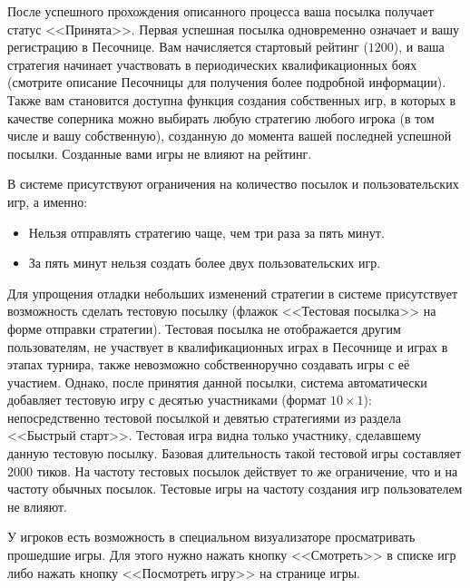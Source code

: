 После успешного прохождения описанного процесса ваша посылка получает статус <<Принята>>. Первая успешная посылка одновременно означает и
вашу регистрацию в Песочнице. Вам начисляется стартовый рейтинг ($1200$), и ваша стратегия начинает участвовать в периодических
квалификационных боях (смотрите описание Песочницы для получения более подробной информации). Также вам становится доступна функция создания
собственных игр, в которых в качестве соперника можно выбирать любую стратегию любого игрока (в том числе и вашу собственную), созданную до
момента вашей последней успешной посылки. Созданные вами игры не влияют на рейтинг.

В системе присутствуют ограничения на количество посылок и пользовательских игр, а именно:
\vspace{-0.15in}
\begin{itemize}
  \item Нельзя отправлять стратегию чаще, чем три раза за пять минут.
\vspace{-0.10in}
  \item За пять минут нельзя создать более двух пользовательских игр.
\vspace{-0.10in}
\end{itemize}

Для упрощения отладки небольших изменений стратегии в системе присутствует возможность сделать тестовую посылку (флажок <<Тестовая посылка>>
на форме отправки стратегии). Тестовая посылка не отображается другим пользователям, не участвует в квалификационных играх в Песочнице и
играх в этапах турнира, также невозможно собственноручно создавать игры с её участием. Однако, после принятия данной посылки, система
автоматически добавляет тестовую игру с десятью участниками (формат $10\times1$): непосредственно тестовой посылкой и девятью стратегиями из
раздела <<Быстрый старт>>. Тестовая игра видна только участнику, сделавшему данную тестовую посылку. Базовая длительность такой тестовой
игры составляет $2000$ тиков. На частоту тестовых посылок действует то же ограничение, что и на частоту обычных посылок. Тестовые игры на
частоту создания игр пользователем не влияют.

У игроков есть возможность в специальном визуализаторе просматривать прошедшие игры. Для этого нужно нажать кнопку <<Смотреть>> в списке игр
либо нажать кнопку <<Посмотреть игру>> на странице игры.

